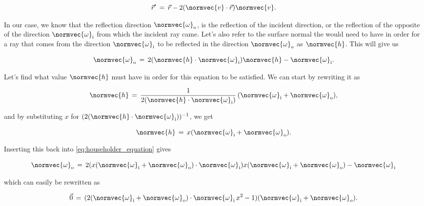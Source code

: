 {\begin{equation}
\vec{r}' \,=\, \vec{r} - 2(\normvec{v}\cdot\vec{r})\normvec{v}.
\end{equation}

In our case, we know that the reflection direction $\normvec{\omega}_{\text{o}}$, is the reflection of the incident direction, or the reflection of the opposite of the direction $\normvec{\omega}_{\text{i}}$ from which the incident ray came. Let's also refer to the surface normal the \microfacet would need to have in order for a ray that comes from the direction $\normvec{\omega}_{\text{i}}$ to be reflected in the direction $\normvec{\omega}_{\text{o}}$ as $\normvec{h}$. This will give us

\begin{equation} \label{eq:householder_equation}
\normvec{\omega}_{\text{o}} \,=\, 2(\normvec{h}\cdot\normvec{\omega}_{\text{i}})\normvec{h} - \normvec{\omega}_{\text{i}}.
\end{equation}

Let's find what value $\normvec{h}$ must have in order for this equation to be satisfied. We can start by rewriting it as

\begin{equation}
\normvec{h} \,=\, \frac{1}{2(\normvec{h}\cdot\normvec{\omega}_{\text{i}})}\,(\normvec{\omega}_{\text{i}} + \normvec{\omega}_{\text{o}}),
\end{equation}

and by substituting $x$ for $(2(\normvec{h}\cdot\normvec{\omega}_{\text{i}}))^{-1}$, we get

\begin{equation} \label{eq:householder_equation_x_introduced}
\normvec{h} \,=\, x(\normvec{\omega}_{\text{i}} + \normvec{\omega}_{\text{o}}).
\end{equation}

Inserting this back into \eqref{eq:householder_equation} gives

\begin{equation}
\normvec{\omega}_{\text{o}} \,=\, 2(x(\normvec{\omega}_{\text{i}} + \normvec{\omega}_{\text{o}})\cdot\normvec{\omega}_{\text{i}})x(\normvec{\omega}_{\text{i}} + \normvec{\omega}_{\text{o}}) - \normvec{\omega}_{\text{i}}
\end{equation}

which can easily be rewritten as

\begin{equation} \label{eq:householder_x_second_order_with_vectors}
\vec{0} \,=\, (2(\normvec{\omega}_{\text{i}} + \normvec{\omega}_{\text{o}})\cdot\normvec{\omega}_{\text{i}}\,x^2 - 1)(\normvec{\omega}_{\text{i}} + \normvec{\omega}_{\text{o}}).
\end{equation}

}
